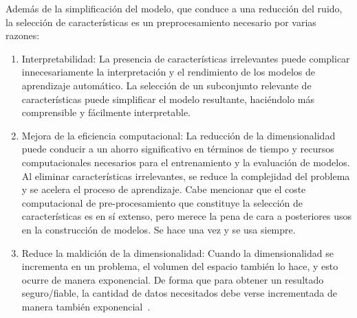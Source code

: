 Además de la simplificación del modelo, que conduce a una reducción del ruido, la
selección de características es un preprocesamiento necesario por varias razones:
\begin{enumerate}
      \item Interpretabilidad: La presencia de características
            irrelevantes puede complicar innecesariamente la interpretación y el
            rendimiento de los modelos de aprendizaje automático. La selección de un
            subconjunto relevante de características puede simplificar el modelo
            resultante, haciéndolo más comprensible y fácilmente interpretable.

      \item Mejora de la eficiencia computacional: La reducción de la
            dimensionalidad puede conducir a un ahorro significativo en términos de
            tiempo y recursos computacionales necesarios para el entrenamiento y la
            evaluación de modelos. Al eliminar características irrelevantes, se reduce
            la complejidad del problema y se acelera el proceso de aprendizaje. Cabe mencionar que el coste computacional de pre-procesamiento que constituye la selección de características es en sí extenso, pero merece la pena de cara a posteriores usos en la construcción de modelos. Se hace una vez y se usa siempre.

      \item Reduce la maldición de la dimensionalidad: Cuando la dimensionalidad
            se incrementa en un problema, el volumen del espacio también lo hace, y esto ocurre de manera exponencial. De forma que para
            obtener un resultado seguro/fiable, la cantidad de datos necesitados debe verse incrementada de manera también exponencial~\cite{udacity2015curse}.
\end{enumerate}


